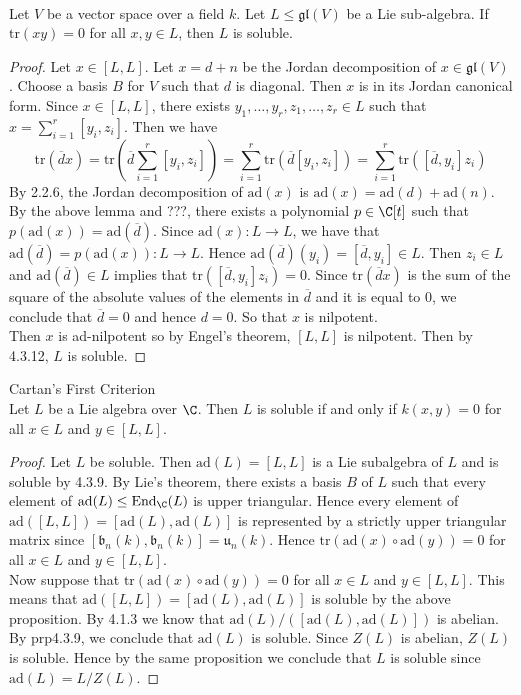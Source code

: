 \documentclass[a4paper]{article}
\begin{document}
\begin{prp}{}{} \\Let $V$ be a vector space over a field $k$. Let $L\leq\mathfrak{gl}(V)$ be a Lie sub-algebra. If $\text{tr}(xy)=0$ for all $x,y\in L$, then $L$ is soluble. 
\begin{proof}
Let $x\in [L,L]$. Let $x=d+n$ be the Jordan decomposition of $x\in\mathfrak{gl}(V)$. Choose a basis $B$ for $V$ such that $d$ is diagonal. Then $x$ is in its Jordan canonical form. Since $x\in[L,L]$, there exists $y_1,\dots,y_r,z_1,\dots,z_r\in L$ such that $x=\sum_{i=1}^r[y_i,z_i]$. Then we have $$\text{tr}(\overline{d}x)=\text{tr}\left(\overline{d}\sum_{i=1}^r[y_i,z_i]\right)=\sum_{i=1}^r\text{tr}(\overline{d}[y_i,z_i])=\sum_{i=1}^r\text{tr}([\overline{d},y_i]z_i)$$ By 2.2.6, the Jordan decomposition of $\text{ad}(x)$ is $\text{ad}(x)=\text{ad}(d)+\text{ad}(n)$. By the above lemma and ???, there exists a polynomial $p\in\C[t]$ such that $p(\text{ad}(x))=\text{ad}(\overline{d})$. Since $\text{ad}(x):L\to L$, we have that $\text{ad}(\overline{d})=p(\text{ad}(x)):L\to L$. Hence $\text{ad}(\overline{d})(y_i)=[\overline{d},y_i]\in L$. Then $z_i\in L$ and $\text{ad}(\overline{d})\in L$ implies that $\text{tr}([\overline{d},y_i]z_i)=0$. Since $\text{tr}(\overline{d}x)$ is the sum of the square of the absolute values of the elements in $\overline{d}$ and it is equal to $0$, we conclude that $\overline{d}=0$ and hence $d=0$. So that $x$ is nilpotent. \\

Then $x$ is ad-nilpotent so by Engel's theorem, $[L,L]$ is nilpotent. Then by 4.3.12, $L$ is soluble. 
\end{proof}
\end{prp}

\begin{thm}{Cartan's First Criterion}{} \\Let $L$ be a Lie algebra over $\C$. Then $L$ is soluble if and only if $k(x,y)=0$ for all $x\in L$ and $y\in[L,L]$. 
\begin{proof}
Let $L$ be soluble. Then $\text{ad}(L)=[L,L]$ is a Lie subalgebra of $L$ and is soluble by 4.3.9. By Lie's theorem, there exists a basis $B$ of $L$ such that every element of $\text{ad}(L)\leq\text{End}_\C(L)$ is upper triangular. Hence every element of $\text{ad}([L,L])=[\text{ad}(L),\text{ad}(L)]$ is represented by a strictly upper triangular matrix since $[\mathfrak{b}_n(k),\mathfrak{b}_n(k)]=\mathfrak{u}_n(k)$. Hence $\text{tr}(\text{ad}(x)\circ\text{ad}(y))=0$ for all $x\in L$ and $y\in[L,L]$. \\

Now suppose that $\text{tr}(\text{ad}(x)\circ\text{ad}(y))=0$ for all $x\in L$ and $y\in[L,L]$. This means that $\text{ad}([L,L])=[\text{ad}(L),\text{ad}(L)]$ is soluble by the above proposition. By 4.1.3 we know that $\text{ad}(L)/([\text{ad}(L),\text{ad}(L)])$ is abelian. By prp4.3.9, we conclude that $\text{ad}(L)$ is soluble. Since $Z(L)$ is abelian, $Z(L)$ is soluble. Hence by the same proposition we conclude that $L$ is soluble since $\text{ad}(L)=L/Z(L)$. 
\end{proof}
\end{thm}
\end{document}
